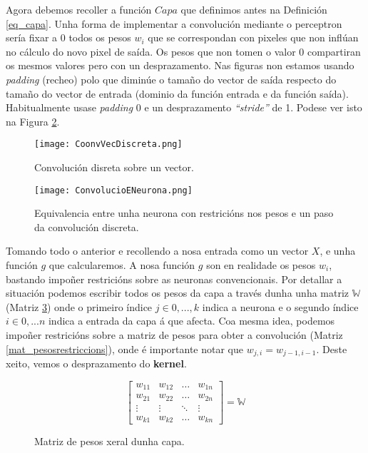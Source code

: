 \documentclass{article}
\begin{document}
Agora debemos recoller a función $Capa$ que definimos antes na Definición \ref{eq_capa}. Unha forma de implementar a convolución mediante o perceptron sería fixar a 0 todos os pesos $w_i$ que se correspondan con pixeles que non inflúan no cálculo do novo pixel de saída. Os pesos que non tomen o valor 0 compartiran os mesmos valores pero con un desprazamento. Nas figuras non estamos usando \textit{padding} (recheo) polo que diminúe o tamaño do vector de saída respecto do tamaño do vector de entrada (dominio da función entrada e da función saída). Habitualmente usase \textit{padding} 0 e un desprazamento \textit{``stride''} de 1. Podese ver isto na Figura \ref{fig:exp_equivalanciaconvpercp}.


\begin{figure}[h]
    \centering
    \texttt{[image: CoonvVecDiscreta.png]}
    \caption{Convolución disreta sobre un vector.}
    \label{fig:enter-label}
\end{figure}

\begin{figure}
    \centering
    \texttt{[image: ConvolucioENeurona.png]}
    \caption{Equivalencia entre unha neurona con restricións nos pesos e un paso da convolución discreta. }
    \label{fig:exp_equivalanciaconvpercp}
\end{figure}


Tomando todo o anterior e recollendo a nosa entrada como un vector $X$, e unha función $g$ que calcularemos. A nosa función $g$ son en realidade os pesos $w_i$, bastando impoñer restricións sobre as neuronas convencionais. Por detallar a situación podemos escribir todos os pesos da capa a través dunha unha matriz $\mathbb{W}$ (Matriz \ref{mat_pesos}) onde o primeiro índice $j \in {0,...,k}$ indica a neurona e o segundo índice $i \in {0,...n}$ indica a entrada da capa á que afecta. Coa mesma idea, podemos impoñer restricións sobre a matriz de pesos para obter a convolución (Matriz \ref{mat_pesosrestriccions}), onde é importante notar que $w_{j,i} = w_{j-1, i-1}$. Deste xeito, vemos o desprazamento do \textbf{kernel}. 

\begin{figure}[h]
    \begin{equation}
    \begin{bmatrix}
    w_{11} & w_{12} & \ldots & w_{1n} \\
    w_{21} & w_{22} & \ldots & w_{2n} \\
    \vdots & \vdots & \ddots & \vdots \\
    w_{k1} & w_{k2} & \ldots & w_{kn}
    \end{bmatrix} = \mathbb{W}
    \end{equation}
    \caption{Matriz de pesos xeral dunha capa.}
    \label{mat_pesos}
\end{figure}
\end{document}
